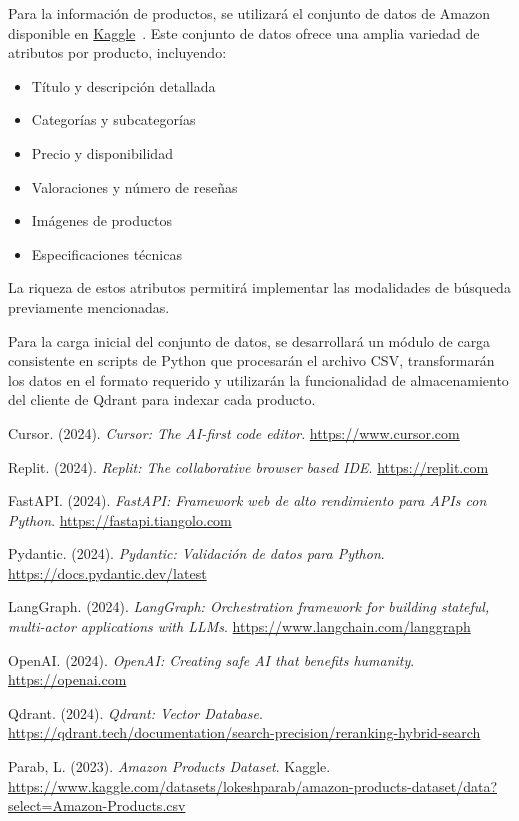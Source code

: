 \documentclass[12pt]{article}
\begin{document}
Para la información de productos, se utilizará el conjunto de datos de Amazon disponible en \href{https://www.kaggle.com/datasets/lokeshparab/amazon-products-dataset/data?select=Amazon-Products.csv}{Kaggle}~\cite{Amazon}. Este conjunto de datos ofrece una amplia variedad de atributos por producto, incluyendo:

\begin{itemize}
    \item Título y descripción detallada
    \item Categorías y subcategorías
    \item Precio y disponibilidad
    \item Valoraciones y número de reseñas
    \item Imágenes de productos
    \item Especificaciones técnicas
\end{itemize}

La riqueza de estos atributos permitirá implementar las modalidades de búsqueda previamente mencionadas.

Para la carga inicial del conjunto de datos, se desarrollará un módulo de carga consistente en scripts de Python que procesarán el archivo CSV, transformarán los datos en el formato requerido y utilizarán la funcionalidad de almacenamiento del cliente de Qdrant para indexar cada producto.

\newpage

\begin{thebibliography}{2}
    \raggedright

    Cursor. (2024). \textit{Cursor: The AI-first code editor}. \url{https://www.cursor.com}

    Replit. (2024). \textit{Replit: The collaborative browser based IDE}. \url{https://replit.com}

    FastAPI. (2024). \textit{FastAPI: Framework web de alto rendimiento para APIs con Python}. \url{https://fastapi.tiangolo.com}

    Pydantic. (2024). \textit{Pydantic: Validación de datos para Python}. \url{https://docs.pydantic.dev/latest}

    LangGraph. (2024). \textit{LangGraph: Orchestration framework for building stateful, multi-actor applications with LLMs}. \url{https://www.langchain.com/langgraph}

    OpenAI. (2024). \textit{OpenAI: Creating safe AI that benefits humanity}. \url{https://openai.com}

    Qdrant. (2024). \textit{Qdrant: Vector Database}. \url{https://qdrant.tech/documentation/search-precision/reranking-hybrid-search}

    Parab, L. (2023). \textit{Amazon Products Dataset}. Kaggle. \url{https://www.kaggle.com/datasets/lokeshparab/amazon-products-dataset/data?select=Amazon-Products.csv}

\end{thebibliography}
\end{document}
